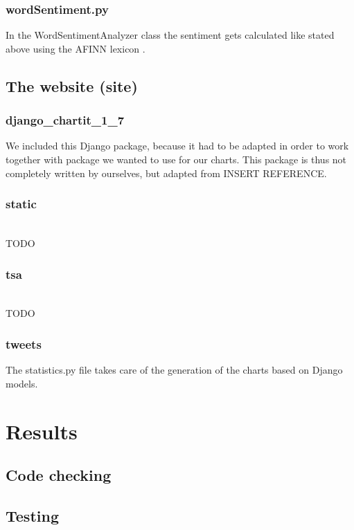 \documentclass[10pt]{IEEEtran}
\begin{document}
\subsubsection{wordSentiment.py}

In the WordSentimentAnalyzer class the sentiment gets calculated like stated above using the AFINN lexicon \cite{AFINN}. 

\subsection{The website (site)}

\subsubsection{django_chartit_1_7}

We included this Django package, because it had to be adapted in order to work together with package we wanted to use for our charts. This package is thus not completely written by ourselves, but adapted from INSERT REFERENCE.

\subsubsection{static}
\\TODO

\subsubsection{tsa}
\\TODO

\subsubsection{tweets}

The statistics.py file takes care of the generation of the charts based on Django models. 


\section{Results}


\subsection{Code checking}


\subsection{Testing}
\end{document}
